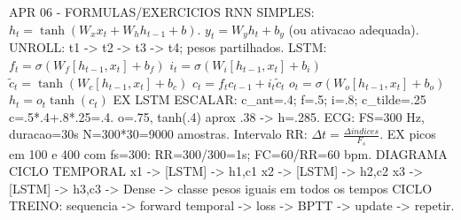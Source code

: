 APR 06 - FORMULAS/EXERCICIOS
RNN SIMPLES:
$h_t=\tanh(W_xx_t+W_hh_{t-1}+b)$.
$y_t=W_yh_t+b_y$ (ou ativacao adequada).
UNROLL: t1 -> t2 -> t3 -> t4; pesos partilhados.
LSTM:
$f_t=\sigma(W_f[h_{t-1},x_t]+b_f)$
$i_t=\sigma(W_i[h_{t-1},x_t]+b_i)$
$\tilde c_t=\tanh(W_c[h_{t-1},x_t]+b_c)$
$c_t=f_tc_{t-1}+i_t\tilde c_t$
$o_t=\sigma(W_o[h_{t-1},x_t]+b_o)$
$h_t=o_t\tanh(c_t)$
EX LSTM ESCALAR:
c_ant=.4; f=.5; i=.8; c_tilde=.25
c=.5*.4+.8*.25=.4.
o=.75, tanh(.4) aprox .38 -> h=.285.
ECG: FS=300 Hz, duracao=30s
N=300*30=9000 amostras.
Intervalo RR: $\Delta t=\frac{\Delta indices}{F_s}$.
EX picos em 100 e 400 com fs=300:
RR=300/300=1s; FC=60/RR=60 bpm.
DIAGRAMA CICLO TEMPORAL
x1 -> [LSTM] -> h1,c1
x2 -> [LSTM] -> h2,c2
x3 -> [LSTM] -> h3,c3 -> Dense -> classe
            pesos iguais em todos os tempos
CICLO TREINO: sequencia -> forward temporal
 -> loss -> BPTT -> update -> repetir.